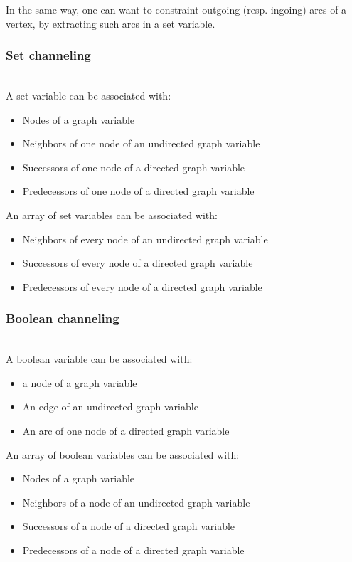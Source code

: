 \documentclass{article}
\begin{document}
In the same way, one can want to constraint outgoing (resp. ingoing) arcs of a vertex, by extracting such arcs in a set variable. 

\subsubsection{Set channeling}~\\

A set variable can be associated with: 
\begin{itemize}
\item Nodes of a graph variable
\item Neighbors of one node of an undirected graph variable
\item Successors of one node of a directed graph variable
\item Predecessors of one node of a directed graph variable
\end{itemize}

An array of set variables can be associated with: 
\begin{itemize}
\item Neighbors of every node of an undirected graph variable
\item Successors of every node of a directed graph variable
\item Predecessors of every node of a directed graph variable
\end{itemize}

\subsubsection{Boolean channeling}~\\

A boolean variable can be associated with: 
\begin{itemize}
\item a node of a graph variable
\item An edge of an undirected graph variable
\item An arc of one node of a directed graph variable
\end{itemize}

An array of boolean variables can be associated with: 
\begin{itemize}
\item Nodes of a graph variable
\item Neighbors of a node of an undirected graph variable
\item Successors of a node of a directed graph variable
\item Predecessors of a node of a directed graph variable
\end{itemize}
\end{document}
